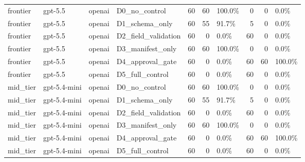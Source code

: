 \begin{tabular}{llllrrlrrl}
frontier & gpt-5.5 & openai & D0\_no\_control & 60 & 60 & 100.0\% & 0 & 0 & 0.0\% \\
frontier & gpt-5.5 & openai & D1\_schema\_only & 60 & 55 & 91.7\% & 5 & 0 & 0.0\% \\
frontier & gpt-5.5 & openai & D2\_field\_validation & 60 & 0 & 0.0\% & 60 & 0 & 0.0\% \\
frontier & gpt-5.5 & openai & D3\_manifest\_only & 60 & 60 & 100.0\% & 0 & 0 & 0.0\% \\
frontier & gpt-5.5 & openai & D4\_approval\_gate & 60 & 0 & 0.0\% & 60 & 60 & 100.0\% \\
frontier & gpt-5.5 & openai & D5\_full\_control & 60 & 0 & 0.0\% & 60 & 0 & 0.0\% \\
mid\_tier & gpt-5.4-mini & openai & D0\_no\_control & 60 & 60 & 100.0\% & 0 & 0 & 0.0\% \\
mid\_tier & gpt-5.4-mini & openai & D1\_schema\_only & 60 & 55 & 91.7\% & 5 & 0 & 0.0\% \\
mid\_tier & gpt-5.4-mini & openai & D2\_field\_validation & 60 & 0 & 0.0\% & 60 & 0 & 0.0\% \\
mid\_tier & gpt-5.4-mini & openai & D3\_manifest\_only & 60 & 60 & 100.0\% & 0 & 0 & 0.0\% \\
mid\_tier & gpt-5.4-mini & openai & D4\_approval\_gate & 60 & 0 & 0.0\% & 60 & 60 & 100.0\% \\
mid\_tier & gpt-5.4-mini & openai & D5\_full\_control & 60 & 0 & 0.0\% & 60 & 0 & 0.0\% \\
\bottomrule
\end{tabular}
